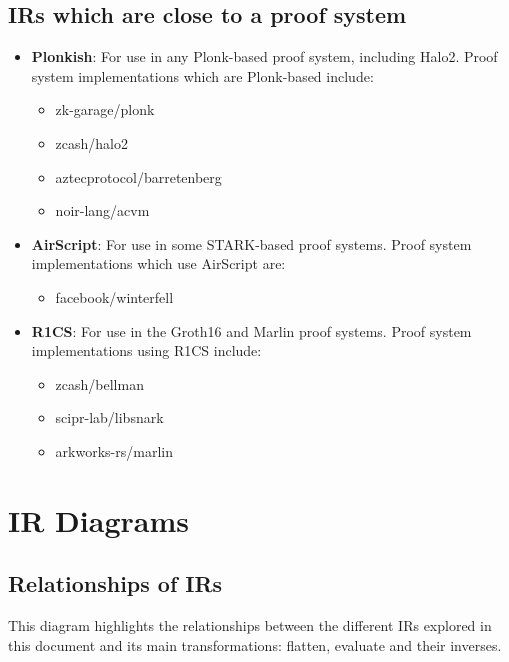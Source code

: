 \documentclass[
    9pt,            %
    techreport,        %
    affiltop,       %
]{art}
\begin{document}
\subsection{IRs which are close to a proof system}
\begin{itemize}
\item \textbf{Plonkish}: For use in any Plonk-based proof system, including Halo2. Proof system implementations which are Plonk-based include: 
    \begin{itemize}
        \item zk-garage/plonk 
        \item zcash/halo2 
        \item aztecprotocol/barretenberg 
        \item noir-lang/acvm
    \end{itemize}
\item \textbf{AirScript}: For use in some STARK-based proof systems. Proof system implementations which use AirScript are: 
    \begin{itemize}
        \item facebook/winterfell
    \end{itemize}
\item \textbf{R1CS}: For use in the Groth16 and Marlin proof systems. Proof system implementations using R1CS include:
    \begin{itemize}
        \item zcash/bellman
        \item scipr-lab/libsnark 
        \item arkworks-rs/marlin
    \end{itemize}
\end{itemize}

\section{IR Diagrams}

\subsection{Relationships of IRs}

This diagram highlights the relationships between the different IRs explored in this document and its main transformations: flatten, evaluate and their inverses.
\end{document}
